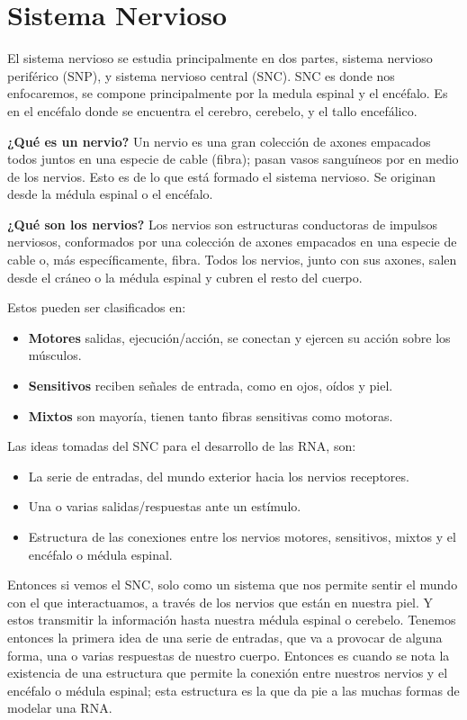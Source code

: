 \section{Sistema Nervioso}

El sistema nervioso se estudia principalmente en dos partes, sistema nervioso periférico (SNP), y sistema nervioso central (SNC). SNC es donde nos enfocaremos, se compone principalmente por la medula espinal y el encéfalo. Es en el encéfalo donde se encuentra el cerebro, cerebelo, y el tallo encefálico.\cite{sistemaNervioso}   

\textbf{¿Qué es un nervio?}
Un nervio es una gran colección de axones empacados todos juntos en una especie de cable (fibra); pasan vasos sanguíneos por en medio de los nervios. Esto es de lo que está formado el sistema nervioso. Se originan desde la médula espinal o el encéfalo. %

\textbf{¿Qué son los nervios?}
Los nervios son estructuras conductoras de impulsos nerviosos, conformados por una colección de axones empacados en una especie de cable o, más específicamente, fibra. Todos los nervios, junto con sus axones, salen desde el cráneo o la médula espinal y cubren el resto del cuerpo.\cite{neurona_A_cerebro}


Estos pueden ser clasificados en:

\begin{itemize}
\item \textbf{Motores} salidas, ejecución/acción, se conectan y ejercen su acción sobre los músculos.
\item \textbf{Sensitivos} reciben señales de entrada, como en ojos, oídos y piel.
\item \textbf{Mixtos} son mayoría, tienen tanto fibras sensitivas como motoras.
\end{itemize}

Las ideas tomadas del SNC para el desarrollo de las RNA, son:
\begin{itemize}
 \item La serie de entradas, del mundo exterior hacia los nervios receptores.
 \item Una o varias salidas/respuestas ante un estímulo.
 \item Estructura de las conexiones entre los nervios motores, sensitivos, mixtos y el encéfalo o médula espinal. 
\end{itemize}

Entonces si vemos el SNC, solo como un sistema que nos permite sentir el mundo con el que interactuamos, a través de los nervios que están en nuestra piel. Y estos transmitir la información hasta nuestra médula espinal o cerebelo. Tenemos entonces la primera idea de una serie de entradas, que va a provocar de alguna forma, una o varias respuestas de nuestro cuerpo. Entonces es cuando se nota la existencia de una estructura que permite la conexión entre nuestros nervios y el encéfalo o médula espinal; esta estructura es la que da pie a las muchas formas de modelar una RNA.

